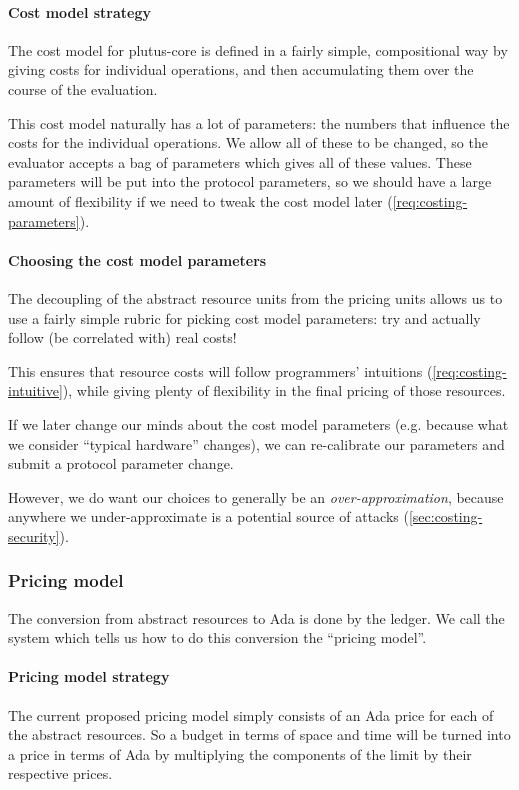 \paragraph{Cost model strategy}
The cost model for \gls{plutus-core} is defined in a fairly simple, compositional way by giving costs for individual operations, and then accumulating them over the course of the evaluation.

This cost model naturally has a lot of parameters: the numbers that influence the costs for the individual operations.
We allow all of these to be changed, so the evaluator accepts a bag of parameters which gives all of these values.
These parameters will be put into the protocol parameters, so we should have a large amount of flexibility if we need to tweak the cost model later (\cref{req:costing-parameters}).

\paragraph{Choosing the cost model parameters}
The decoupling of the abstract resource units from the pricing units allows us to use a fairly simple rubric for picking cost model parameters: try and actually follow (be correlated with) real costs!

This ensures that resource costs will follow programmers' intuitions (\cref{req:costing-intuitive}), while giving plenty of flexibility in the final pricing of those resources.

If we later change our minds about the cost model parameters (e.g. because what we consider ``typical hardware'' changes), we can re-calibrate our parameters and submit a protocol parameter change.

However, we do want our choices to generally be an \emph{over-approximation}, because anywhere we under-approximate is a potential source of attacks (\cref{sec:costing-security}).

\subsubsection{Pricing model}
The conversion from abstract resources to Ada is done by the ledger.
We call the system which tells us how to do this conversion the ``pricing model''.

\paragraph{Pricing model strategy}
The current proposed pricing model simply consists of an Ada price for each of the abstract resources.
So a budget in terms of \gls{space} and \gls{time} will be turned into a price in terms of Ada by multiplying the components of the limit by their respective prices.

